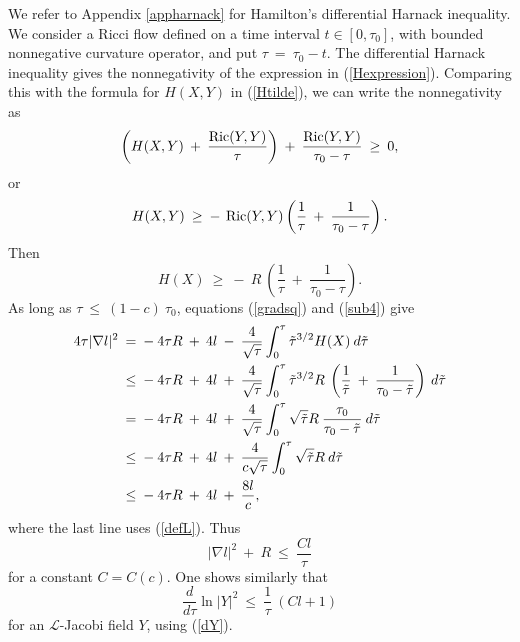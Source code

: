 We refer to Appendix \ref{appharnack} for
Hamilton's differential Harnack inequality.  We consider a Ricci flow defined on
a  time interval $t \in [0, \tau_0]$, with bounded nonnegative curvature operator,
and put $\tau \: = \: \tau_0 - t$. The differential Harnack inequality gives the
nonnegativity of the expression in (\ref{Hexpression}).
Comparing this with the formula for $H(X,Y)$ in (\ref{Htilde}), we can write
the nonnegativity as
\begin{equation}
\left( H(X, Y) \: + \: \frac{\operatorname{Ric}(Y,Y)}{\tau} \right) \: + \:
\frac{\operatorname{Ric}(Y,Y)}{\tau_0 - \tau} \: \ge \: 0,
\end{equation}
or
\begin{equation} \label{ineqtoshow}
H(X, Y) \: \ge \: - \: \operatorname{Ric}(Y, Y) \left( \frac{1}{\tau} \: + \:
\frac{1}{\tau_0 - \tau} \right).
\end{equation}
Then
\begin{equation}
H(X) \: \ge \: - \: R \: \left( \frac{1}{\tau} \: + \:
\frac{1}{\tau_0 - \tau} \right).
\end{equation}
As long as $\tau \: \le \: (1-c) \: \tau_0$, equations (\ref{gradsq}) and (\ref{sub4})
give
\begin{align}
4 \tau |\nabla l|^2 \: & = \: - \: 4 \tau R \: + \: 4l \: - \:
\frac{4}{\sqrt{\tau}} \int_0^\tau \tilde{\tau}^{3/2} H(X) \: d\tilde{\tau} \\
& \le \: - \: 4 \tau R \: + \: 4l \: + \:
\frac{4}{\sqrt{\tau}} \int_0^\tau \tilde{\tau}^{3/2} R \:
\left( \frac{1}{\tilde{\tau}} \: + \:
\frac{1}{\tau_0 - \tilde{\tau}} \right)
  \: d\tilde{\tau} \notag \\
& = \: - \: 4 \tau R \: + \: 4l \: + \:
\frac{4}{\sqrt{\tau}} \int_0^\tau \sqrt{\tilde\tau} R \:
\frac{\tau_0}{\tau_0 - \tilde{\tau}}
\: d\tilde{\tau} \notag \\
& \le \: - \: 4 \tau R \: + \: 4l \: + \:
\frac{4}{c \sqrt{\tau}} \int_0^\tau \sqrt{\tilde\tau} R
\: d\tilde{\tau} \notag \\
& \le \: - \: 4 \tau R \: + \: 4l \: + \:
\frac{8l}{c}, \notag
\end{align}
where the last line uses (\ref{defL}).
Thus
\begin{equation} \label{I.(7.16)}
|\nabla l|^2 \: + \: R \: \le \: \frac{Cl}{\tau}
\end{equation}
for a constant $C = C(c)$.
One shows similarly that
\begin{equation}
\frac{d}{d\tau} \ln |Y|^2 \: \le \: \frac{1}{\tau} \: (Cl+1)
\end{equation}
for an ${\mathcal L}$-Jacobi field $Y$, using (\ref{dY}).

